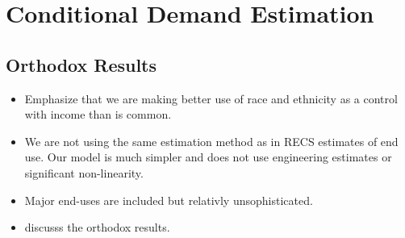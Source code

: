 \documentclass{article}
\begin{document}
\section{Conditional Demand Estimation}

  \subsection{Orthodox Results}
  
  \begin{itemize}
    \item Emphasize that we are making better use of race and ethnicity as a control with income than is common.
    \item We are not using the same estimation method as in RECS estimates of end use.  Our model is much simpler and does not use engineering estimates or significant non-linearity.
    \item Major end-uses are included but relativly unsophisticated.
    \item discusss the orthodox results.
  \end{itemize}
  
  
  
\end{document}
